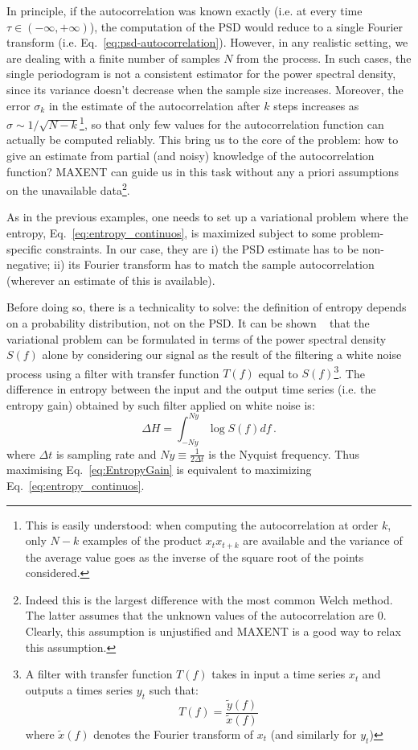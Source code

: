 \documentclass{aa}
\begin{document}
In principle, if the autocorrelation was known exactly (i.e. at every time $\tau \in (-\infty,+\infty)$), the computation of the PSD would reduce to a single Fourier transform (i.e. Eq.~\eqref{eq:psd-autocorrelation}). However, in any realistic setting, we are dealing with a finite number of samples $N$ from the process. In such cases, the single periodogram is not a consistent estimator for the power spectral density, since its variance doesn't decrease when the sample size increases. 
Moreover, the error $\sigma_k$ in the estimate of the autocorrelation after $k$ steps increases as $\sigma \sim 1/\sqrt{N - k}$\footnote{
This is easily understood: when computing the autocorrelation at order $k$, only $N-k$ examples of the product $x_t x_{t+k}$ are available and the variance of the average value goes as the inverse of the square root of the points considered.
}, so that only few values for the autocorrelation function can actually be computed reliably.
This bring us to the core of the problem: how to give an estimate from partial (and noisy) knowledge of the autocorrelation function? MAXENT can guide us in this task without any a priori assumptions on the unavailable data\footnote{Indeed this is the largest difference with the most common Welch method. The latter assumes that the unknown values of the autocorrelation are $0$. Clearly, this assumption is unjustified and MAXENT is a good way to relax this assumption.}.

As in the previous examples, one needs to set up a variational problem where the entropy, Eq.~\eqref{eq:entropy_continuos}, is maximized 
subject to some problem-specific constraints. In our case, they are i) the PSD estimate has to be non-negative; ii) its Fourier transform has to match the sample autocorrelation (wherever an estimate of this is available).

Before doing so, there is a technicality to solve: the definition of entropy depends on a probability distribution, not on the PSD.
It can be shown ~\citep[e.g.]{AblesMESA, Bartlett} that the variational problem can be formulated in terms of the power spectral density $S(f)$ alone by considering our signal as the result of the filtering a white noise process using a filter with transfer function $T(f)$ equal to $S(f)$\footnote{
A filter with transfer function $T(f)$ takes in input a time series $x_t$ and outputs a times series $y_t$ such that:
$$T(f) = \frac{\tilde{y}(f)}{\tilde{x}(f)}$$
where $\tilde{x}(f)$ denotes the Fourier transform of $x_t$ (and similarly for $y_t$)
}.
The difference in entropy between the input and the output time series (i.e. the entropy gain) obtained by such filter applied on white noise is:
\begin{equation}\label{eq:EntropyGain}
    \Delta H = \int_{- Ny}^{Ny}\log S(f) df\,.
\end{equation}
where $\Delta t$ is sampling rate and $Ny \equiv \frac{1}{2 \Delta t}$  is the Nyquist frequency.
Thus maximising Eq.~\eqref{eq:EntropyGain} is equivalent to maximizing Eq.~\eqref{eq:entropy_continuos}.
\end{document}
